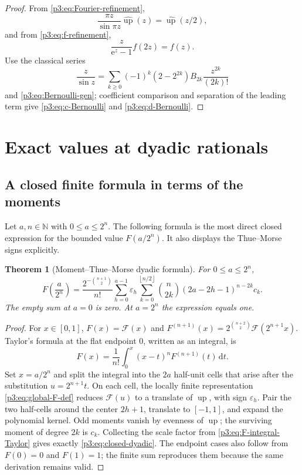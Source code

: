 \documentclass[11pt]{article}
\numberwithin{equation}{section}
\newtheorem{theorem}{Theorem}[section]
\theoremstyle{definition}
\theoremstyle{remark}
\newcommand{\N}{\mathbb N}
\newcommand{\GF}{\mathcal F}
\newcommand{\upf}{\operatorname{up}}
\newcommand{\eps}{\varepsilon}
\newcommand{\dd}{\,\mathrm d}
\newcommand{\e}{\mathrm e}
\newcommand{\floor}[1]{\left\lfloor#1\right\rfloor}
\begin{document}
\begin{proof}
From \eqref{p3:eq:Fourier-refinement},
\[
 \frac{\pi z}{\sin\pi z}\widehat{\upf}(z)=\widehat{\upf}(z/2),
\]
and from \eqref{p3:eq:f-refinement},
\[
 \frac{z}{\e^z-1}f(2z)=f(z).
\]
Use the classical series
\[
 \frac{z}{\sin z}=\sum_{k\ge0}(-1)^k(2-2^{2k})B_{2k}\frac{z^{2k}}{(2k)!}
\]
and \eqref{p3:eq:Bernoulli-gen}; coefficient comparison and separation of the leading term give \eqref{p3:eq:c-Bernoulli} and \eqref{p3:eq:d-Bernoulli}.
\end{proof}

\section{Exact values at dyadic rationals}\label{p3:sec:dyadic}

\subsection{A closed finite formula in terms of the moments}

Let $a,n\in\N$ with $0\le a\le2^n$.  The following formula is the most direct closed expression for the bounded value $F(a/2^n)$.  It also displays the Thue--Morse signs explicitly.

\begin{theorem}[Moment--Thue--Morse dyadic formula]\label{p3:thm:closed-dyadic}
For $0\le a\le2^n$,
\begin{equation}\label{p3:eq:closed-dyadic}
\boxed{
 F\!\left(\frac{a}{2^n}\right)
 =\frac{2^{-\binom{n+1}{2}}}{n!}
 \sum_{h=0}^{a-1}\eps_h
 \sum_{k=0}^{\floor{n/2}}
 \binom n{2k}(2a-2h-1)^{n-2k}c_k .}
\end{equation}
The empty sum at $a=0$ is zero.  At $a=2^n$ the expression equals one.
\end{theorem}

\begin{proof}
For $x\in[0,1]$, $F(x)=\GF(x)$ and $F^{(n+1)}(x)=2^{\binom{n+2}{2}}\GF(2^{n+1}x)$.  Taylor's formula at the flat endpoint $0$, written as an integral, is
\begin{equation}\label{p3:eq:F-integral-Taylor}
 F(x)=\frac{1}{n!}\int_0^x(x-t)^nF^{(n+1)}(t)\dd t.
\end{equation}
Set $x=a/2^n$ and split the integral into the $2a$ half-unit cells that arise after the substitution $u=2^{n+1}t$.  On each cell, the locally finite representation \eqref{p3:eq:global-F-def} reduces $\GF(u)$ to a translate of $\upf$, with sign $\eps_h$.  Pair the two half-cells around the center $2h+1$, translate to $[-1,1]$, and expand the polynomial kernel.  Odd moments vanish by evenness of $\upf$; the surviving moment of degree $2k$ is $c_k$.  Collecting the scale factor from \eqref{p3:eq:F-integral-Taylor} gives exactly \eqref{p3:eq:closed-dyadic}.  The endpoint cases also follow from $F(0)=0$ and $F(1)=1$; the finite sum reproduces them because the same derivation remains valid.
\end{proof}
\end{document}
